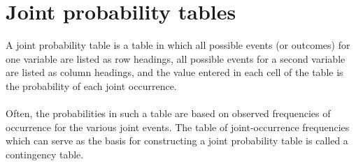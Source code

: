 

\section{Joint probability tables}
A joint probability table is a table in which all possible events (or outcomes) for one variable are listed as
row headings, all possible events for a second variable are listed as column headings, and the value entered in
each cell of the table is the probability of each joint occurrence. 
\\
\\
\noindent Often, the probabilities in such a table are based
on observed frequencies of occurrence for the various joint events. The table
of joint-occurrence frequencies which can serve as the basis for constructing a joint probability table is called a
contingency table.


